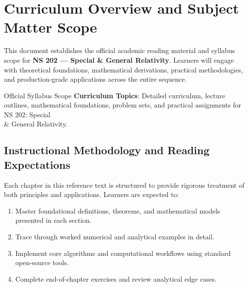 \section{Curriculum Overview and Subject Matter Scope}

This document establishes the official academic reading material and syllabus scope for \textbf{NS 202 --- Special \& General Relativity}. Learners will engage with theoretical foundations, mathematical derivations, practical methodologies, and production-grade applications across the entire sequence.

\begin{InsightBox}{Official Syllabus Scope}
  \textbf{Curriculum Topics}: Detailed curriculum, lecture outlines, mathematical foundations, problem sets, and practical assignments for NS 202: Special \\& General Relativity.
\end{InsightBox}

\subsection{Instructional Methodology and Reading Expectations}

Each chapter in this reference text is structured to provide rigorous treatment of both principles and applications. Learners are expected to:
\begin{enumerate}
  \item Master foundational definitions, theorems, and mathematical models presented in each section.
  \item Trace through worked numerical and analytical examples in detail.
  \item Implement core algorithms and computational workflows using standard open-source tools.
  \item Complete end-of-chapter exercises and review analytical edge cases.
\end{enumerate}

